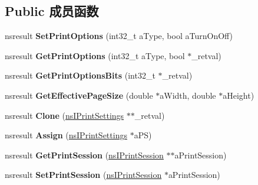 \subsection*{Public 成员函数}
\begin{DoxyCompactItemize}
\item 
\mbox{\label{interfacens_i_print_settings_a50faf50a7daee1bb527fbd997dff2b3d}} 
nsresult {\bfseries Set\+Print\+Options} (int32\+\_\+t a\+Type, bool a\+Turn\+On\+Off)
\item 
\mbox{\label{interfacens_i_print_settings_a2780d11e2550aee5ff4ec1a79653237a}} 
nsresult {\bfseries Get\+Print\+Options} (int32\+\_\+t a\+Type, bool $\ast$\+\_\+retval)
\item 
\mbox{\label{interfacens_i_print_settings_a97d7c4420844ede73afc20ccf150b33a}} 
nsresult {\bfseries Get\+Print\+Options\+Bits} (int32\+\_\+t $\ast$\+\_\+retval)
\item 
\mbox{\label{interfacens_i_print_settings_a29a0de3b5c8909152ab1e7053335d52a}} 
nsresult {\bfseries Get\+Effective\+Page\+Size} (double $\ast$a\+Width, double $\ast$a\+Height)
\item 
\mbox{\label{interfacens_i_print_settings_aecc23d24ed095ad0fa633fc4b8ab2dcd}} 
nsresult {\bfseries Clone} (\hyperlink{interfacens_i_print_settings}{ns\+I\+Print\+Settings} $\ast$$\ast$\+\_\+retval)
\item 
\mbox{\label{interfacens_i_print_settings_ae722110135114007540068a9a715ebd0}} 
nsresult {\bfseries Assign} (\hyperlink{interfacens_i_print_settings}{ns\+I\+Print\+Settings} $\ast$a\+PS)
\item 
\mbox{\label{interfacens_i_print_settings_a386e7c667ffedcd5f234987dc5a1080c}} 
nsresult {\bfseries Get\+Print\+Session} (\hyperlink{interfacens_i_supports}{ns\+I\+Print\+Session} $\ast$$\ast$a\+Print\+Session)
\item 
\mbox{\label{interfacens_i_print_settings_adc88fd8927a48de548dff93a914182c9}} 
nsresult {\bfseries Set\+Print\+Session} (\hyperlink{interfacens_i_supports}{ns\+I\+Print\+Session} $\ast$a\+Print\+Session)

\end{DoxyCompactItemize}
